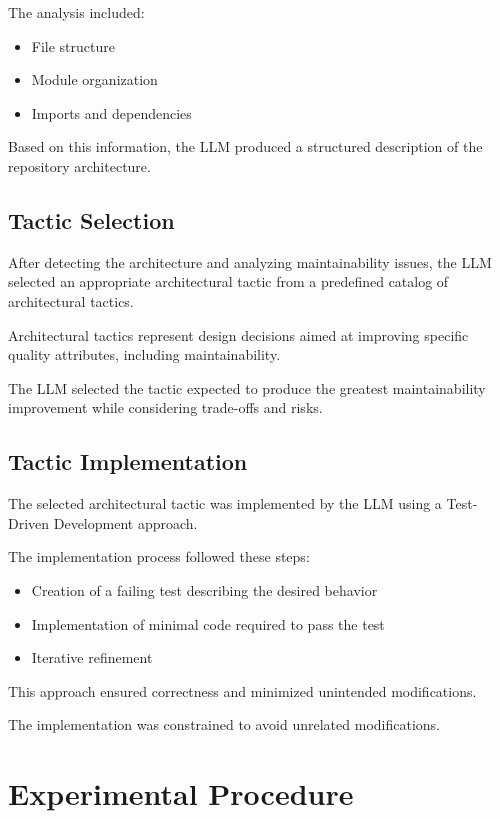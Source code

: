 The analysis included:

\begin{itemize}
\item File structure
\item Module organization
\item Imports and dependencies
\end{itemize}

Based on this information, the LLM produced a structured description of the repository architecture.

\subsection{Tactic Selection}

After detecting the architecture and analyzing maintainability issues, the LLM selected an appropriate architectural tactic from a predefined catalog of architectural tactics.

Architectural tactics represent design decisions aimed at improving specific quality attributes, including maintainability.

The LLM selected the tactic expected to produce the greatest maintainability improvement while considering trade-offs and risks.

\subsection{Tactic Implementation}

The selected architectural tactic was implemented by the LLM using a Test-Driven Development approach.

The implementation process followed these steps:

\begin{itemize}
\item Creation of a failing test describing the desired behavior
\item Implementation of minimal code required to pass the test
\item Iterative refinement
\end{itemize}

This approach ensured correctness and minimized unintended modifications.

The implementation was constrained to avoid unrelated modifications.

\section{Experimental Procedure}

